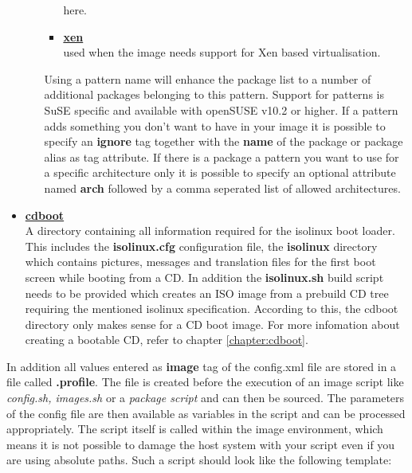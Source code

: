 \begin{itemize}
\begin{enumerate}
\begin{itemize}
                      here.
                \item \textbf{\underline{xen}}\\
                      used when the image needs support for Xen based
                      virtualisation.
                \end{itemize}
				Using a pattern name will enhance the package list to
				a number of additional packages belonging to this pattern.
				Support for patterns is SuSE specific and available with
				openSUSE v10.2 or higher. If a pattern adds something you
                don't want to have in your image it is possible to specify
                an \textbf{ignore} tag together with the \textbf{name} of the
                package or package alias as tag attribute. If there is a
                package a pattern you want to use for a specific architecture
                only it is possible to specify an optional attribute named
                \textbf{arch} followed by a comma seperated list of allowed
                architectures.
      \end{enumerate}
\item \textbf{\underline{cdboot}}\\
A directory containing all information required for the isolinux
boot loader. This includes the \textbf{isolinux.cfg} configuration
file, the \textbf{isolinux} directory which contains pictures, messages and
translation files for the first boot screen while booting from a CD.
In addition the \textbf{isolinux.sh} build script needs to be provided
which creates an ISO image from a prebuild CD tree requiring the mentioned
isolinux specification. According to this, the cdboot directory
only makes sense for a CD boot image. For more infomation about creating
a bootable CD, refer to chapter \ref{chapter:cdboot}.
\end{itemize}

In addition all values entered as \textbf{image} tag of the config.xml
file are stored in a file called \textbf{.profile}. The file is created
before the execution of an image script like \textit{config.sh, images.sh}
or a \textit{package script} and can then be sourced. The parameters
of the config file are then available as variables in the
script and can be processed appropriately. The script itself is called
within the image environment, which means it
is not possible to damage the host system with your script even if you
are using absolute paths. Such a script should look like the following
template:

